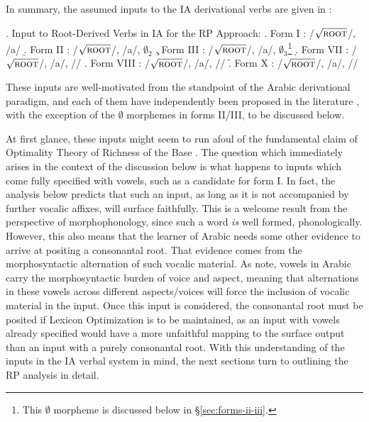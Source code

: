 \documentclass[12pt,twoside,letterpaper]{article}
\begin{document}
In summary, the assumed inputs to the IA derivational verbs are given in \Next:

\ex. Input to Root-Derived Verbs in IA for the RP Approach:
\a. Form I {\em {}}: /$\sqrt{\textrm{\textsc{root}}}$/, /a/
\b. Form II {\em {}}: /$\sqrt{\textrm{\textsc{root}}}$/, /a/, $\emptyset_{\textrm{2}}$
\c. Form III {\em {}}: /$\sqrt{\textrm{\textsc{root}}}$/, /a/, $\emptyset_{\textrm{3}}$\footnote{This $\emptyset$ morpheme is discussed below in \S{\ref{sec:forms-ii-iii}}.}
\d. Form VII {\em {}}: /$\sqrt{\textrm{\textsc{root}}}$/, /a/, //
\e. Form VIII {\em {}}: /$\sqrt{\textrm{\textsc{root}}}$/, /a/, //
\f. Form X {\em {}}: /$\sqrt{\textrm{\textsc{root}}}$/, /a/, //

These inputs are well-motivated from the standpoint of the Arabic derivational paradigm, and each of them have independently been proposed in the literature \citep{mccarthy81,mccarthy90,ussishkin00}, with the exception of the $\emptyset$ morphemes in forms II/III, to be discussed below. 

At first glance, these inputs might seem to run afoul of the fundamental claim of Optimality Theory of Richness of the Base \citep{prince04}. The question which immediately arises in the context of the discussion below is what happens to inputs which come fully specified with vowels, such as a candidate {\em {}} for form I. In fact, the analysis below predicts that such an input, as long as it is not accompanied by further vocalic affixes, will surface faithfully. This is a welcome result from the perspective of morphophonology, since such a word \emph{is} well formed, phonologically. However, this also means that the learner of Arabic needs some other evidence to arrive at positing a consonantal root. That evidence comes from the morphosyntactic alternation of such vocalic material. As \cite{diesing95} note, vowels in Arabic carry the morphosyntactic burden of voice and aspect, meaning that alternations in these vowels across different aspects/voices will force the inclusion of vocalic material in the input. Once this input is considered, the consonantal root must be posited if Lexicon Optimization is to be maintained, as an input with vowels already specified would have a more unfaithful mapping to the surface output than an input with a purely consonantal root. With this understanding of the inputs in the IA verbal system in mind, the next sections turn to outlining the RP analysis in detail.
\end{document}
